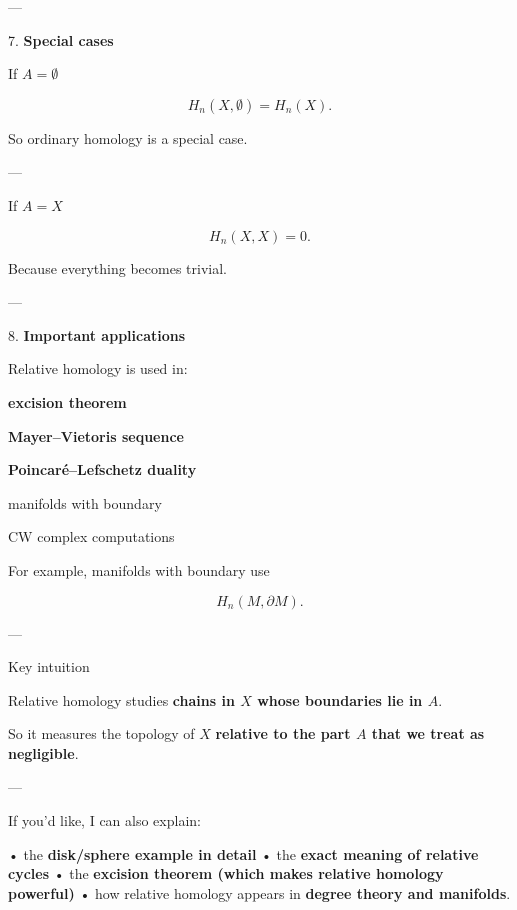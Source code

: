 \documentclass[12pt,a4paper]{report}
\begin{document}
\begin{description}
\begin{description}
---

\item 7. \textbf{Special cases}

\begin{description}

\item If $A = \emptyset$

$$ H_n(X,\emptyset) = H_n(X).  $$

So ordinary homology is a special case.

---

\item If $A = X$

$$ H_n(X,X) = 0.  $$

Because everything becomes trivial.

---

\end{description}

\item 8. \textbf{Important applications}

Relative homology is used in:

\begin{description}

\item \textbf{excision theorem}
\item \textbf{Mayer–Vietoris sequence}
\item \textbf{Poincaré–Lefschetz duality}
\item manifolds with boundary
\item CW complex computations

\end{description}

For example, manifolds with boundary use

$$ H_n(M,\partial M).  $$

\end{description}
---

\item Key intuition

Relative homology studies \textbf{chains in $X$ whose boundaries lie in $A$}.

So it measures the topology of $X$ \textbf{relative to the part $A$ that we treat as negligible}.

---

If you'd like, I can also explain:

• the \textbf{disk/sphere example in detail}
• the \textbf{exact meaning of relative cycles}
• the \textbf{excision theorem (which makes relative homology powerful)}
• how relative homology appears in \textbf{degree theory and manifolds}.


\end{description}
\end{document}
